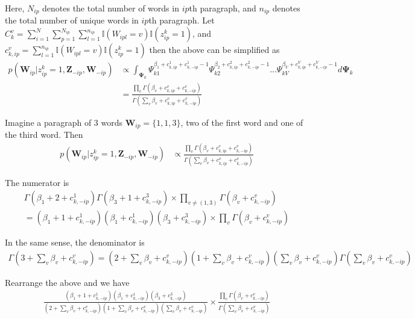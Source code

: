 Here, $N_{ip}$ denotes the total number of words in $ip$th paragraph, and $n_{ip}$ denotes the total number of unique words in $ip$th paragraph. Let $C_k^v = \sum_{i=1}^N\sum_{p=1}^{N_{ip}}\sum_{l=1}^{n_{ip}}\mathbb{I}(W_{ipl}=v)\mathbb{I}(z_{ip}^k=1)$, and $c_{k,ip}^v = \sum_{l=1}^{n_{ip}}\mathbb{I}(W_{ipl}=v)\mathbb{I}(z_{ip}^k=1)$ then the above can be simplified as
\begin{align}
    p(\mathbf{W}_{ip}|z_{ip}^k=1,\mathbf{Z}_{-ip},\mathbf{W}_{-ip}) &\propto \int_{\pmb{\Psi}_k}\Psi_{k1}^{\beta_1+c_{k,ip}^1+ c_{k,-ip}^1-1}\Psi_{k2}^{\beta_2+c_{k,ip}^2+ c_{k,-ip}^2-1} ... \Psi_{kV}^{\beta_V+c_{k,ip}^V+ c_{k,-ip}^V-1} d\pmb{\Psi}_k \nonumber \\
    &= \frac{\prod_v \Gamma(\beta_v + c_{k,ip}^v + c_{k,-ip}^v)}{\Gamma(\sum_v \beta_v + c_{k,ip}^v + c_{k,-ip}^v)}
\end{align}

Imagine a paragraph of 3 words $\mathbf{W}_{ip} = \{1,1,3\}$, two of the first word and one of the third word. Then
\begin{align}
    p(\mathbf{W}_{ip}|z_{ip}^k=1,\mathbf{Z}_{-ip},\mathbf{W}_{-ip}) &\propto \frac{\prod_v \Gamma(\beta_v + c_{k,ip}^v + c_{k,-ip}^v)}{\Gamma(\sum_v \beta_v + c_{k,ip}^v + c_{k,-ip}^v)}
\end{align}

The numerator is 
\begin{align}
    \Gamma(\beta_1 + 2 + c_{k,-ip}^1)\Gamma(\beta_3 + 1 + c_{k,-ip}^3) \times \prod_{v \neq (1,3)}\Gamma(\beta_v + c_{k,-ip}^v) \nonumber \\
    = (\beta_1 + 1 + c_{k,-ip}^1)(\beta_1 + c_{k,-ip}^1)(\beta_3 + c_{k,-ip}^3) \times \prod_v \Gamma(\beta_v + c_{k,-ip}^v)
\end{align}

In the same sense, the denominator is
{\small
\begin{align}
    \Gamma(3 + \sum_v \beta_v + c_{k,-ip}^v) = (2+\sum_v \beta_v + c_{k,-ip}^v)(1+\sum_v \beta_v + c_{k,-ip}^v)(\sum_v \beta_v + c_{k,-ip}^v)\Gamma(\sum_v \beta_v + c_{k,-ip}^v)
\end{align}
}

Rearrange the above and we have
\begin{align}
    \frac{(\beta_1 + 1 + c_{k,-ip}^1)(\beta_1 + c_{k,-ip}^1)(\beta_3 + c_{k,-ip}^3)}{(2+\sum_v \beta_v + c_{k,-ip}^v)(1+\sum_v \beta_v + c_{k,-ip}^v)(\sum_v \beta_v + c_{k,-ip}^v)} \times \frac{\prod_v \Gamma(\beta_v + c_{k,-ip}^v)}{\Gamma(\sum_v \beta_v + c_{k,-ip}^v)}
\end{align}

